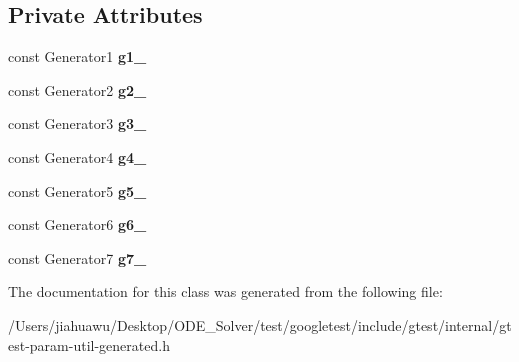 \subsection*{Private Attributes}
\begin{DoxyCompactItemize}
\item 
\mbox{\label{classtesting_1_1internal_1_1_cartesian_product_holder7_adcf0358076c8e289e15a9f57e43eee1f}} 
const Generator1 {\bfseries g1\+\_\+}
\item 
\mbox{\label{classtesting_1_1internal_1_1_cartesian_product_holder7_a704f651db08383a13d28d07266cd33c3}} 
const Generator2 {\bfseries g2\+\_\+}
\item 
\mbox{\label{classtesting_1_1internal_1_1_cartesian_product_holder7_a1f5af59a8847a143da8b309a6a541add}} 
const Generator3 {\bfseries g3\+\_\+}
\item 
\mbox{\label{classtesting_1_1internal_1_1_cartesian_product_holder7_aff48909c84b414d8b8e5d04ef93c953f}} 
const Generator4 {\bfseries g4\+\_\+}
\item 
\mbox{\label{classtesting_1_1internal_1_1_cartesian_product_holder7_af6fa2bc63f60900a73037480cb7bc177}} 
const Generator5 {\bfseries g5\+\_\+}
\item 
\mbox{\label{classtesting_1_1internal_1_1_cartesian_product_holder7_a291561ee8d2316dab94ebe6f2efb2f7d}} 
const Generator6 {\bfseries g6\+\_\+}
\item 
\mbox{\label{classtesting_1_1internal_1_1_cartesian_product_holder7_a61473c49fc8b1dec59ffb31a5295e05c}} 
const Generator7 {\bfseries g7\+\_\+}
\end{DoxyCompactItemize}


The documentation for this class was generated from the following file\+:\begin{DoxyCompactItemize}
\item 
/\+Users/jiahuawu/\+Desktop/\+O\+D\+E\+\_\+\+Solver/test/googletest/include/gtest/internal/gtest-\/param-\/util-\/generated.\+h\end{DoxyCompactItemize}
